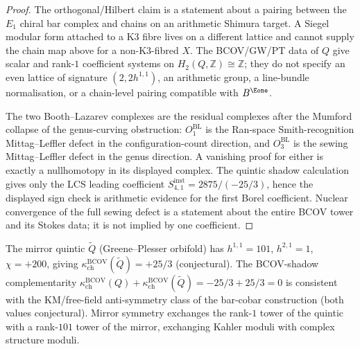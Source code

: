 \begin{proof}
The orthogonal/Hilbert claim is a statement about a pairing between the
$E_1$ chiral bar complex and chains on an arithmetic Shimura target. A
Siegel modular form attached to a K$3$ fibre lives on a different lattice
and cannot supply the chain map above for a non-K$3$-fibred $X$. The
BCOV/GW/PT data of $Q$ give scalar and rank-$1$ coefficient systems on
$H_2(Q,\mathbb Z)\cong\mathbb Z$; they do not specify an even lattice of
signature $(2,2h^{1,1})$, an arithmetic group, a line-bundle
normalisation, or a chain-level pairing compatible with $B^{\Eone}$.

The two Booth--Lazarev complexes are the residual complexes after the
Mumford collapse of the genus-curving obstruction: $O_1^{\mathrm{BL}}$
is the Ran-space Smith-recognition Mittag--Leffler defect in the
configuration-count direction, and $O_3^{\mathrm{BL}}$ is the sewing
Mittag--Leffler defect in the genus direction. A vanishing proof for
either is exactly a nullhomotopy in its displayed complex. The quintic
shadow calculation gives only the LCS leading coefficient
$S_{4,1}^{\mathrm{inst}}=2875/(-25/3)$, hence the displayed sign check is
arithmetic evidence for the first Borel coefficient. Nuclear convergence
of the full sewing defect is a statement about the entire BCOV tower and
its Stokes data; it is not implied by one coefficient.
\end{proof}

\begin{remark}
\label{rem:quintic-mirror-shadow}
The mirror quintic $\widetilde{Q}$ (Greene--Plesser orbifold) has $h^{1,1} = 101$, $h^{2,1} = 1$, $\chi = +200$, giving $\kappa_{\mathrm{ch}}^{\mathrm{BCOV}}(\widetilde{Q}) = +25/3$ (conjectural). The BCOV-shadow complementarity $\kappa_{\mathrm{ch}}^{\mathrm{BCOV}}(Q) + \kappa_{\mathrm{ch}}^{\mathrm{BCOV}}(\widetilde{Q}) = -25/3 + 25/3 = 0$ is consistent with the KM/free-field anti-symmetry class of the bar-cobar construction (both values conjectural). Mirror symmetry exchanges the rank-$1$ tower of the quintic with a rank-$101$ tower of the mirror, exchanging Kahler moduli with complex structure moduli.
\end{remark}

